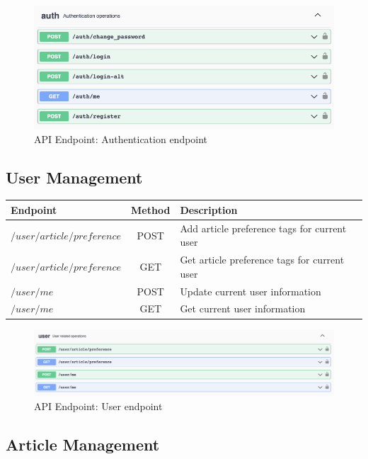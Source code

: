 \begin{figure}[!h]
    \centering
    \includegraphics[width=1\textwidth]{chapters/chapter_06/authentication-operations}
    \caption{API Endpoint: Authentication endpoint}
    \label{fig:api-authentication-endpoint}
\end{figure}


\subsection{User Management}\label{subsec:user-management}


\begin{tabularx}{\textwidth}{lcX}
  \toprule
  Endpoint & Method & Description \\
  \midrule
  $/user/article/preference$ & POST & Add article preference tags for current user \\
  $/user/article/preference$ & GET & Get article preference tags for current user \\
  $/user/me$ & POST & Update current user information \\
  $/user/me$ & GET & Get current user information \\
  \bottomrule
\end{tabularx}

\begin{figure}[!h]
    \centering
    \includegraphics[width=1\textwidth]{chapters/chapter_06/user-operations}
    \caption{API Endpoint: User endpoint}
    \label{fig:api-user-endpoint}
\end{figure}


\subsection{Article Management}\label{subsec:article-management}

